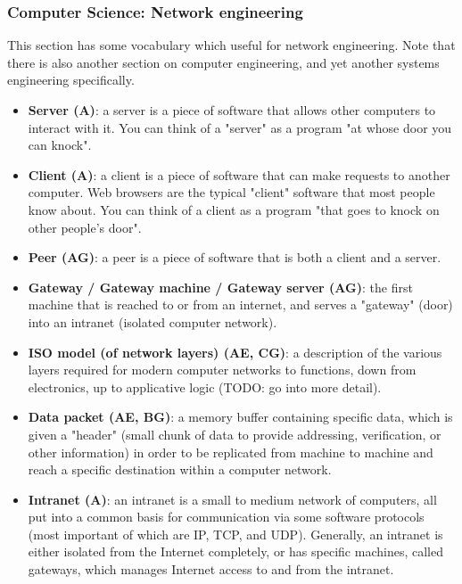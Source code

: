 \documentclass{article}
\begin{document}
\subsubsection*{Computer Science: Network engineering}

This section has some vocabulary which useful for network engineering. Note that there is also another section on computer engineering, and yet another systems engineering specifically. 

\begin{itemize}

	\item \textbf{Server (A)}: a server is a piece of software that allows other computers to interact with it. You can think of a "server" as a program "at whose door you can knock".

	\item \textbf{Client (A)}: a client is a piece of software that can make requests to another computer. Web browsers are the typical "client" software that most people know about. You can think of a client as a program "that goes to knock on other people's door".

	\item \textbf{Peer (AG)}: a peer is a piece of software that is both a client and a server.

	\item \textbf{Gateway / Gateway machine / Gateway server (AG)}: the first machine that is reached to or from an internet, and serves a "gateway" (door) into an intranet (isolated computer network).

	\item \textbf{ISO model (of network layers) (AE, CG)}: a description of the various layers required for modern computer networks to functions, down from electronics, up to applicative logic (TODO: go into more detail).

	\item \textbf{Data packet (AE, BG)}: a memory buffer containing specific data, which is given a "header" (small chunk of data to provide addressing, verification, or other information) in order to be replicated from machine to machine and reach a specific destination within a computer network.

	\item \textbf{Intranet (A)}: an intranet is a small to medium network of computers, all put into a common basis for communication via some software protocols (most important of which are IP, TCP, and UDP). Generally, an intranet is either isolated from the Internet completely, or has specific machines, called gateways, which manages Internet access to and from the intranet.


\end{itemize}
\end{document}
